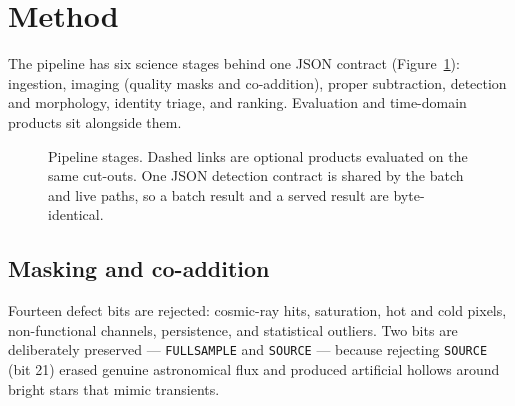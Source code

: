 \documentclass[11pt,a4paper]{article}
\newcommand{\code}[1]{\texttt{\small #1}}
\begin{document}
{\section{Method}
\label{sec:method}

The pipeline has six science stages behind one JSON contract (Figure~\ref{fig:pipeline}):
ingestion, imaging (quality masks and co-addition), proper subtraction, detection and morphology,
identity triage, and ranking. Evaluation and time-domain products sit alongside them.

\begin{figure}[t]
\centering
{}
\caption{Pipeline stages. Dashed links are optional products evaluated on the same cut-outs. One
JSON detection contract is shared by the batch and live paths, so a batch result and a served result
are byte-identical.}
\label{fig:pipeline}
\end{figure}

\subsection{Masking and co-addition}
Fourteen defect bits are rejected: cosmic-ray hits, saturation, hot and cold pixels, non-functional
channels, persistence, and statistical outliers. Two bits are deliberately preserved ---
\code{FULLSAMPLE} and \code{SOURCE} --- because rejecting \code{SOURCE} (bit 21) erased genuine
astronomical flux and produced artificial hollows around bright stars that mimic transients.

}
\end{document}
